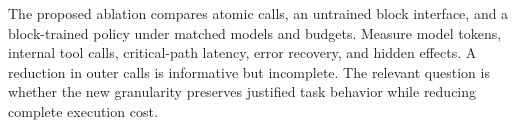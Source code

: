 The proposed ablation compares atomic calls, an untrained block interface, and a block-trained policy under matched models and budgets. Measure model tokens, internal tool calls, critical-path latency, error recovery, and hidden effects. A reduction in outer calls is informative but incomplete. The relevant question is whether the new granularity preserves justified task behavior while reducing complete execution cost.

